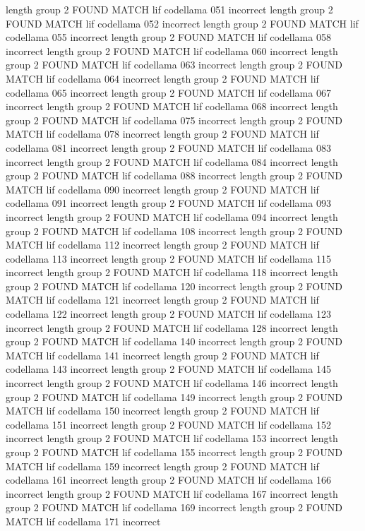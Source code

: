 length group  2
FOUND MATCH lif codellama 051 incorrect
length group  2
FOUND MATCH lif codellama 052 incorrect
length group  2
FOUND MATCH lif codellama 055 incorrect
length group  2
FOUND MATCH lif codellama 058 incorrect
length group  2
FOUND MATCH lif codellama 060 incorrect
length group  2
FOUND MATCH lif codellama 063 incorrect
length group  2
FOUND MATCH lif codellama 064 incorrect
length group  2
FOUND MATCH lif codellama 065 incorrect
length group  2
FOUND MATCH lif codellama 067 incorrect
length group  2
FOUND MATCH lif codellama 068 incorrect
length group  2
FOUND MATCH lif codellama 075 incorrect
length group  2
FOUND MATCH lif codellama 078 incorrect
length group  2
FOUND MATCH lif codellama 081 incorrect
length group  2
FOUND MATCH lif codellama 083 incorrect
length group  2
FOUND MATCH lif codellama 084 incorrect
length group  2
FOUND MATCH lif codellama 088 incorrect
length group  2
FOUND MATCH lif codellama 090 incorrect
length group  2
FOUND MATCH lif codellama 091 incorrect
length group  2
FOUND MATCH lif codellama 093 incorrect
length group  2
FOUND MATCH lif codellama 094 incorrect
length group  2
FOUND MATCH lif codellama 108 incorrect
length group  2
FOUND MATCH lif codellama 112 incorrect
length group  2
FOUND MATCH lif codellama 113 incorrect
length group  2
FOUND MATCH lif codellama 115 incorrect
length group  2
FOUND MATCH lif codellama 118 incorrect
length group  2
FOUND MATCH lif codellama 120 incorrect
length group  2
FOUND MATCH lif codellama 121 incorrect
length group  2
FOUND MATCH lif codellama 122 incorrect
length group  2
FOUND MATCH lif codellama 123 incorrect
length group  2
FOUND MATCH lif codellama 128 incorrect
length group  2
FOUND MATCH lif codellama 140 incorrect
length group  2
FOUND MATCH lif codellama 141 incorrect
length group  2
FOUND MATCH lif codellama 143 incorrect
length group  2
FOUND MATCH lif codellama 145 incorrect
length group  2
FOUND MATCH lif codellama 146 incorrect
length group  2
FOUND MATCH lif codellama 149 incorrect
length group  2
FOUND MATCH lif codellama 150 incorrect
length group  2
FOUND MATCH lif codellama 151 incorrect
length group  2
FOUND MATCH lif codellama 152 incorrect
length group  2
FOUND MATCH lif codellama 153 incorrect
length group  2
FOUND MATCH lif codellama 155 incorrect
length group  2
FOUND MATCH lif codellama 159 incorrect
length group  2
FOUND MATCH lif codellama 161 incorrect
length group  2
FOUND MATCH lif codellama 166 incorrect
length group  2
FOUND MATCH lif codellama 167 incorrect
length group  2
FOUND MATCH lif codellama 169 incorrect
length group  2
FOUND MATCH lif codellama 171 incorrect
